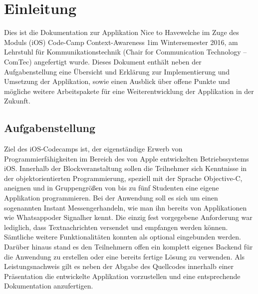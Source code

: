 \section{Einleitung}
Dies ist die Dokumentation zur Applikation \glqq Nice to Have\grqq{ }welche im Zuge des Moduls \glqq (iOS) Code-Camp Context-Awareness 1\grqq{ }im Wintersemester 2016, am Lehrstuhl für Kommunikationstechnik (Chair for Communication Technology – ComTec) angefertigt wurde. Dieses Dokument enthält neben der Aufgabenstellung eine Übersicht und Erklärung zur Implementierung und Umsetzung der Applikation, sowie einen Ausblick über offene Punkte und mögliche weitere Arbeitspakete für eine Weiterentwicklung der Applikation in der Zukunft.

\subsection{Aufgabenstellung}
Ziel des iOS-Codecamps ist, der eigenständige Erwerb von Programmierfähigkeiten im Bereich des von Apple entwickelten Betriebssystems iOS. Innerhalb der Blockveranstaltung sollen die Teilnehmer sich Kenntnisse in der objektorientierten Programmierung, speziell mit der Sprache Objective-C, aneignen und in Gruppengrößen von bis zu fünf Studenten eine eigene Applikation programmieren. 
Bei der Anwendung soll es sich um einen sogenannten \glqq Instant Messenger\grqq{ }handeln, wie man ihn bereits von Applikationen wie \glqq Whatsapp\grqq{ }oder \glqq Signal\grqq{ }her kennt.
Die einzig fest vorgegebene Anforderung war lediglich, dass Textnachrichten versendet und empfangen werden können. Sämtliche weitere Funktionalitäten konnten als optional eingebunden werden. Darüber hinaus stand es den Teilnehmern offen ein komplett eigenes Backend für die Anwendung zu erstellen oder eine bereits fertige Lösung zu verwenden.\newline
\newline
Als Leistungsnachweis gilt es neben der Abgabe des Quellcodes innerhalb einer Präsentation die entwickelte Applikation vorzustellen und eine entsprechende Dokumentation anzufertigen. 
\newpage 